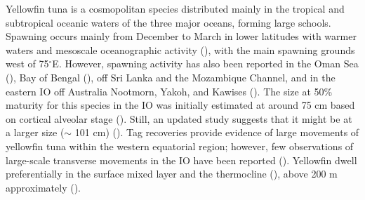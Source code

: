 \documentclass[
]{scrartcl}
\begin{document}
Yellowfin tuna is a cosmopolitan species distributed mainly in the
tropical and subtropical oceanic waters of the three major oceans,
forming large schools. Spawning occurs mainly from December to March in
lower latitudes with warmer waters and mesoscale oceanographic activity
(), with the main spawning grounds west of 75\(^\circ\)E. However,
spawning activity has also been reported in the Oman Sea
(), Bay of Bengal
(), off Sri Lanka and the Mozambique Channel, and in the eastern IO
off Australia Nootmorn, Yakoh, and Kawises
(). The
size at 50\% maturity for this species in the IO was initially estimated
at around 75 cm based on cortical alveolar stage
(). Still, an updated study suggests that it might be at a larger
size (\(\sim\) 101 cm)
(). Tag recoveries provide evidence of large movements of yellowfin
tuna within the western equatorial region; however, few observations of
large-scale transverse movements in the IO have been reported
(). Yellowfin dwell preferentially in the surface mixed layer and
the thermocline (), above 200 m approximately
().
\end{document}
